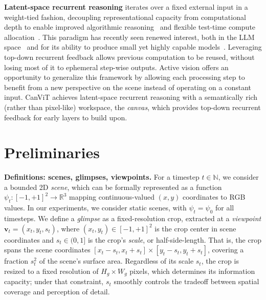 \documentclass{article}
\begin{document}
\textbf{Latent-space recurrent reasoning} iterates over a fixed external input in a weight-tied fashion,
decoupling representational capacity from computational depth
to enable improved algorithmic reasoning~\cite{dehghaniUniversalTransformers2018,yangLoopedTransformersAre2023,saunshiReasoningLatentThoughts2024,wangHierarchicalReasoningModel2025,jolicoeur-martineauLessMoreRecursive2025}
and flexible test-time compute allocation~\cite{gravesAdaptiveComputationTime2017,baninoPonderNetLearningPonder2021}.
This paradigm has recently seen renewed interest,
both in the \ac{LLM} space~\cite{haoTrainingLargeLanguage2025,geipingScalingTestTimeCompute2025}
and for its ability to produce small yet highly capable models~\cite{wangHierarchicalReasoningModel2025,jolicoeur-martineauLessMoreRecursive2025}.
Leveraging top-down recurrent feedback allows previous computation to be reused,
without losing most of it to ephemeral step-wise outputs.
Active vision offers an opportunity to generalize this framework
by allowing each processing step to benefit from a new perspective on the scene
instead of operating on a constant input.
CanViT achieves latent-space recurrent reasoning
with a semantically rich (rather than pixel-like) workspace, the \emph{canvas},
which provides top-down recurrent feedback for early layers to build upon.



\section{Preliminaries}
\label{sec:preliminaries}

\textbf{Definitions: scenes, glimpses, viewpoints.}
For a timestep $t \in \mathbb{N}$,
we consider a bounded 2D \emph{scene},
which can be formally represented as
a function $\psi_t : [-1, +1]^2 \to \mathbb{R}^3$
mapping continuous-valued $(x,y)$ coordinates to RGB values.
In our experiments, we consider static scenes,
with $\psi_t = \psi_0$ for all timesteps.
We define a \emph{glimpse}
as a fixed-resolution crop,
extracted at a \emph{viewpoint} $\mathbf{v}_t = (x_t, y_t, s_t)$,
where $(x_t, y_t) \in [-1,+1]^2$ is the crop center in scene coordinates
and $s_t \in (0, 1]$ is the crop's \emph{scale}, or half-side-length.
That is, the crop spans the scene coordinates
$[x_t - s_t, x_t + s_t] \times [y_t - s_t, y_t + s_t]$,
covering a fraction $s_t^2$ of the scene's surface area.
Regardless of its scale $s_t$,
the crop is resized to a fixed resolution of $H_g \times W_g$ pixels,
which determines its information capacity;
under that constraint, $s_t$ smoothly controls the tradeoff between spatial coverage and perception of detail.
\end{document}
